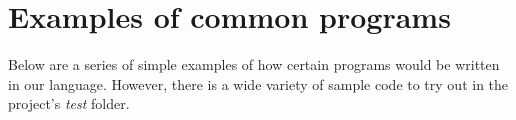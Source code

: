 \documentclass[10pt,a4paper]{article}
\begin{document}
\newpage
\appendix

\section{Examples of common programs}\label{sec:Ejemplos de programas habituales}
Below are a series of simple examples of how certain programs would be written in our language. However, there is a wide variety of sample code to try out in the project's \textit{test} folder.






\end{document}
